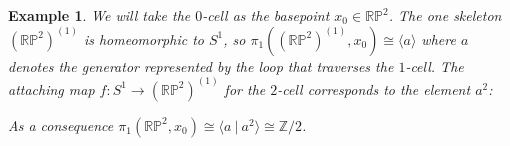 \documentclass[11pt, letterpaper, oneside]{report}
\theoremstyle{pplain}
\theoremstyle{ddefinition}
\newtheorem{example}[theorem]{Example}
\theoremstyle{nnn}
\theoremstyle{eexercise}
\newcommand{\Z}{{\mathbb Z}}
\newcommand{\RP}{{\mathbb R\mathbb P}}
\begin{document}
\begin{example}
We will take the $0$-cell as the basepoint $x_{0}\in \RP^{2}$.
The one skeleton  $(\RP^{2})^{(1)}$ is homeomorphic to $S^{1}$, so
$\pi_{1}((\RP^{2})^{(1)}, x_{0}) \cong \langle a \rangle $
where $a$ denotes the generator represented by the loop that traverses the $1$-cell. 
The attaching map $f\colon S^{1} \to (\RP^{2})^{(1)}$ for the $2$-cell corresponds to the element $a^{2}$:



As a consequence $\pi_{1}(\RP^{2}, x_{0}) \cong \langle a \ | \ a^{2} \rangle \cong \Z/2$. 

\end{example}
\end{document}
